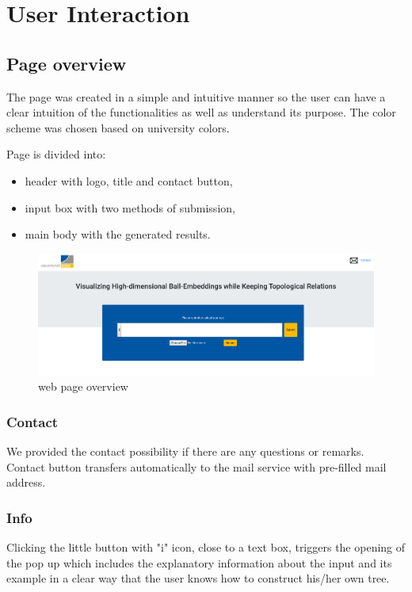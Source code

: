 \documentclass[]{article}
\begin{document}
\section{User Interaction}

\subsection{Page overview}
The page was created in a simple and intuitive manner so the user can have a clear intuition of the functionalities as well as understand its purpose. The color scheme was chosen based on university colors. 

Page is divided into: 
\begin{itemize}
	\item header with logo, title and contact button,
	\item input box with two methods of submission,
	\item main body with the generated results.
\end{itemize}


\begin{figure}[H]
	\includegraphics[width=\textwidth]{res/page.png}
	\caption{web page overview}
	\label{fig:page}
\end{figure}


\subsubsection{Contact}
We provided the contact possibility if there are any questions or remarks. Contact button transfers automatically to the mail service with pre-filled mail address.

\subsubsection{Info}
Clicking the little button with "i" icon, close to a text box, triggers the opening of the pop up which includes the explanatory information about the input and its example in a clear way that the user knows how to construct his/her own tree. 
\end{document}
